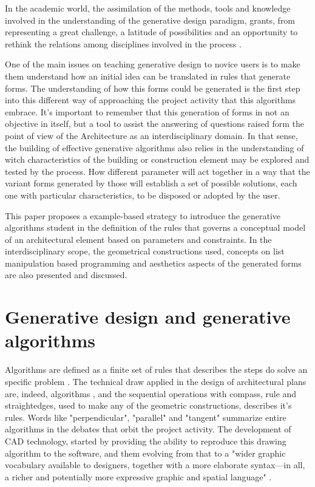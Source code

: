 \documentclass[preprint,12pt,3p]{elsarticle}
\begin{document}
In the academic world, the assimilation of the methods, tools and knowledge involved in the understanding of the generative design paradigm, grants, from representing a great challenge, a latitude of possibilities and an opportunity to rethink the relations among disciplines involved in the process \cite{kolarevic2003} \cite{aag2010113}.

One of the main issues on teaching generative design to novice users is to make them understand how an initial idea can be translated in rules that generate forms. The understanding of how this forms could be generated is the first step into this different way of approaching the project activity that this algorithms embrace. It's important to remember that this generation of forms in not an objective in itself, but a tool to assist the answering of questions raised form the point of view of the Architecture as an interdisciplinary domain. In that sense, the building of effective generative algorithms also relies in the understanding of witch characteristics of the building or construction element may be explored and tested by the process. How different parameter will act together in a way that the variant forms generated by those will establish a set of possible solutions, each one with particular characteristics, to be disposed or adopted by the user.

This paper proposes a example-based strategy to introduce the generative algorithms student in the definition of the rules that governs a conceptual model of an architectural element based on parameters and constraints. In the interdisciplinary scope, the geometrical constructions used, concepts on list manipulation based programming and aesthetics aspects of the generated forms are also presented and discussed.


\section{Generative design and generative algorithms}
\label{generaalgor}

Algorithms are defined as a finite set of rules that describes the steps do solve an specific problem \cite{knuth1997art}. The technical draw applied in the design of architectural plans are, indeed, algorithms \cite[chap. 3]{terzidis2006algorithmic} , and the sequential operations with compass, rule and straightedges, used to make any of the geometric constructions, describes it's rules. Words like "perpendicular", "parallel" and "tangent" summarize entire algorithms in the debates that orbit the project activity. The development of CAD technology, started by providing the ability to reproduce this drawing algorithm to the software, and them evolving from that to a "wider graphic vocabulary available to designers, together with a more elaborate syntax---in all, a richer and potentially more expressive graphic and spatial language" \cite[chap. 15]{mitchell2008}.
\end{document}
